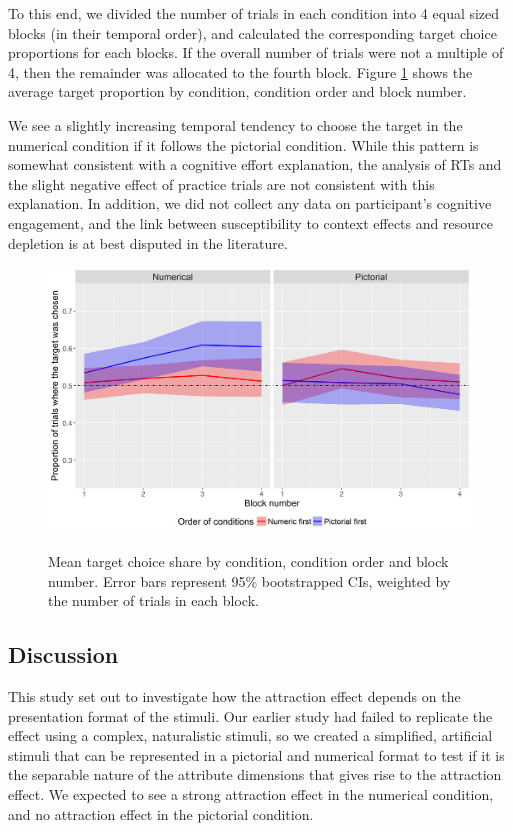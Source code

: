 \documentclass[11pt,a4paper]{article}
\begin{document}
To this end, we divided the number of trials in each condition into 4 equal sized blocks (in their temporal order), and calculated the corresponding target choice proportions for each blocks. If the overall number of trials were not a multiple of 4, then the remainder was allocated to the fourth block. Figure \ref{fig:Block_order} shows the average target proportion by condition, condition order and block number.

We see a slightly increasing temporal tendency to choose the target in the numerical condition if it follows the pictorial condition. While this pattern is somewhat consistent with a cognitive effort explanation, the analysis of RTs and the slight negative effect of practice trials are not consistent with this explanation. In addition, we did not collect any data on participant's cognitive engagement, and the link between susceptibility to context effects and resource depletion is at best disputed in the literature. 


\begin{figure}
\centering
\caption{Mean target choice share by condition, condition order and block number. Error bars represent 95\% bootstrapped CIs, weighted by the number of trials in each block.}
\includegraphics[width=1\textwidth]{Block_order.png}
\label{fig:Block_order}
\end{figure}




\subsection{Discussion}

This study set out to investigate how the attraction effect depends on the presentation format of the stimuli. Our earlier study had failed to replicate the effect using a complex, naturalistic stimuli, so we created a simplified, artificial stimuli that can be represented in a pictorial and numerical format to test if it is the separable nature of the attribute dimensions that gives rise to the attraction effect.  We expected to see a strong attraction effect in the numerical condition, and no attraction effect in the pictorial condition.
\end{document}
